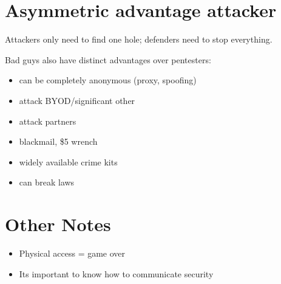 \documentclass[letterpaper]{article}
\newcommand{\p}{\vspace{1em}\par}		%
\begin{document}
\section{Asymmetric advantage attacker}
Attackers only need to find one hole; defenders need to stop everything.
\p Bad guys also have distinct advantages over pentesters:
\begin{itemize}
\item can be completely anonymous (proxy, spoofing)
\item attack BYOD/significant other
\item attack partners
\item blackmail, \$5 wrench
\item widely available crime kits
\item can break laws
\end{itemize}

\section{Other Notes}
\begin{itemize}
\item Physical access = game over
\item Its important to know how to communicate security  
\end{itemize}
\end{document}
